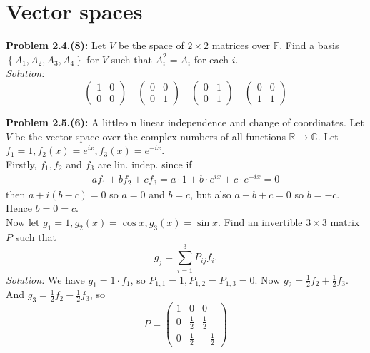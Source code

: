 \documentclass[a4paper]{article}
\theoremstyle{plain}%
\theoremstyle{definition}
\theoremstyle{remark}
\begin{document}
\section{Vector spaces}


    \textbf{Problem 2.4.(8):} Let $V$ be the space of $2 \times 2$ matrices
    over $\mathbb{F}$. Find a basis
    $\left\{ A_1, A_2, A_3, A_4 \right\} $ for $V$ such that
    $A_i^2 = A_i$ for each $i$.\\
    \linebreak
    \textit{Solution:} 
    \[
    \begin{pmatrix} 
        1 & 0\\
        0 & 0
    \end{pmatrix} \quad
    \begin{pmatrix} 
        0 & 0\\
        0 & 1
    \end{pmatrix} \quad
    \begin{pmatrix} 
        0 & 1\\
        0 & 1
    \end{pmatrix} \quad
    \begin{pmatrix} 
        0 & 0\\
        1 & 1
    \end{pmatrix} 
    \] 
    

    \textbf{Problem 2.5.(6):} A littleo n linear independence and change of
    coordinates. Let $V$ be the vector space over the complex numbers of all
    functions $\mathbb{R} \to \mathbb{C}$. Let
    $f_1 = 1, f_2(x) = e^{ix}, f_3(x) = e^{-ix}$.\\
    \linebreak
    Firstly, $ f_1,f_2$
 and $f_3$ are lin. indep. since if
 \begin{align*}
     a f_1 + bf_2 + cf_3
     = a \cdot 1 + b \cdot e^{ix} + c \cdot e^{-ix} = 0
 \end{align*}
 then
 $a + i (b-c) = 0$ so $a = 0$ and $b = c$, but also
 $a + b+ c = 0$ so $b = -c$. Hence $b = 0 = c$.\\
 Now let $g_1 = 1, g_2(x) = \cos x , g_3(x) = \sin x$. Find
 an invertible $3 \times 3$ matrix $P$ such that
 \[
 g_j = \sum_{i=1}^{3} P_{ij}f_i.
 \] 
\textit{Solution:}
We have $g_1 = 1 \cdot f_1$, so
$P_{1,1}=1, P_{1,2}=P_{1,3}=0$.
Now $g_2 = \frac{1}{2} f_2 + \frac{1}{2}f_3$.\\
And $g_3 = \frac{1}{2}f_2 - \frac{1}{2}f_3$, so
\[
    P = \begin{pmatrix} 1 & 0 & 0\\
        0 & \frac{1}{2} & \frac{1}{2}\\
        0 & \frac{1}{2} & - \frac{1}{2}
    \end{pmatrix} 
\] 
\end{document}
